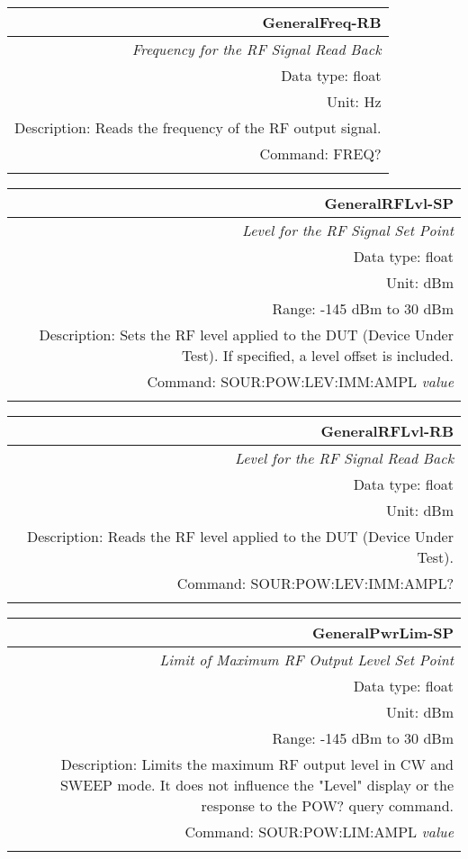 \documentclass[openany]{article}
\begin{document}
		\begin{tabular}{N}
			\hline
			\bfseries GeneralFreq-RB \\ \hline
			\emph{Frequency for the RF Signal Read Back} \\
			Data type: float \\
			Unit: Hz \\
			Description: Reads the frequency of the RF output signal. \\
			Command: FREQ? \\
			\\

		\end{tabular}


		\begin{tabular}{N}
			\hline
			\bfseries GeneralRFLvl-SP \\ \hline
			\emph{Level for the RF Signal Set Point} \\
			Data type: float \\
			Unit: dBm \\
			Range: -145 dBm to 30 dBm \\
			Description: Sets the RF level applied to the DUT (Device Under Test). If specified, a level offset is included. \\
			Command: SOUR:POW:LEV:IMM:AMPL \emph{value} \\
			\\
			
		\end{tabular}


		\begin{tabular}{N}
			\hline
			\bfseries GeneralRFLvl-RB \\ \hline
			\emph{Level for the RF Signal Read Back} \\
			Data type: float \\
			Unit: dBm \\
			Description: Reads the RF level applied to the DUT (Device Under Test). \\
			Command: SOUR:POW:LEV:IMM:AMPL? \\
			\\ 

		\end{tabular}


		\begin{tabular}{N}
			\hline
			\bfseries GeneralPwrLim-SP \\ \hline
			\emph{Limit of Maximum RF Output Level Set Point} \\
			Data type: float \\
			Unit: dBm \\
			Range: -145 dBm to 30 dBm \\
			Description: Limits the maximum RF output level in CW and SWEEP mode. It does not influence the "Level" display or the response to the POW? query command. \\
			Command: SOUR:POW:LIM:AMPL \emph{value} \\
			\\
			
		\end{tabular}
\end{document}
